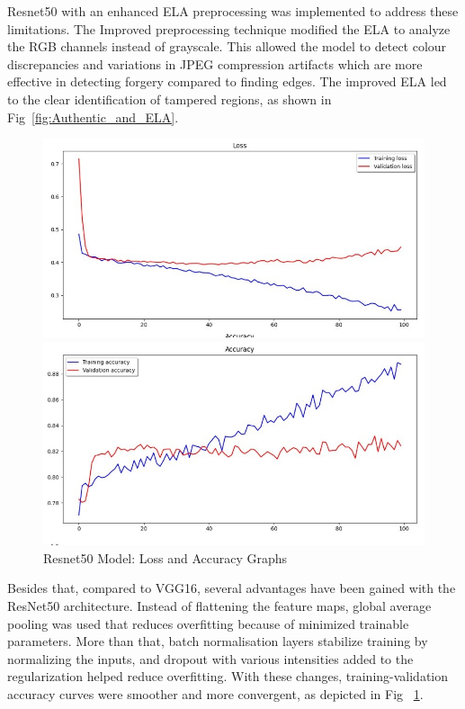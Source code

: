 \documentclass{ieeeaccess}
\begin{document}
  Resnet50 with an enhanced ELA preprocessing was implemented to address these limitations. The Improved preprocessing technique modified the ELA to analyze the RGB channels instead of grayscale. This allowed the model to detect colour discrepancies and variations in JPEG compression artifacts which are more effective in detecting forgery compared to finding edges.
  The improved ELA led to the clear identification of tampered regions, as shown in Fig~\ref{fig:Authentic_and_ELA}.
  
  \begin{figure}[h!]
  	\centering
  	\begin{minipage}{0.45\textwidth}
  		\centering
  		\includegraphics[width=\linewidth]{Graph_LOSS.jpg}
  	\end{minipage}
  	\hfill
  	\begin{minipage}{0.45\textwidth}
  		\centering
  		\includegraphics[width=\linewidth]{Graph_ACC.jpg}
  		
  	\end{minipage}
  	\caption{Resnet50 Model: Loss and Accuracy Graphs}
  	\label{fig:Resnet50 Loss and Accuracy Graphs}
  \end{figure}
  Besides that, compared to VGG16, several advantages have been gained with the ResNet50 architecture. Instead of flattening the feature maps, global average pooling was used that reduces overfitting because of minimized trainable parameters. More than that, batch normalisation layers stabilize training by normalizing the inputs, and dropout with various intensities added to the regularization helped reduce overfitting. With these changes, training-validation accuracy curves were smoother and more convergent, as depicted in Fig ~\ref{fig:Resnet50 Loss and Accuracy Graphs}.
 
\end{document}

